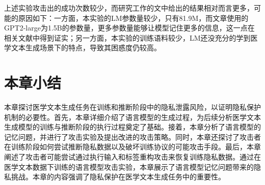 上述实验攻击出的成功次数较少，而研究工作\cite{Extrac_Train_Data_From_LM}的文中给出的结果相对而言更多，可能的原因如下：一方面，本实验的LM参数量较少，只有81.9M，而文章\cite{Extrac_Train_Data_From_LM}使用的GPT2-large为1.5B的参数量，更多参数量能够让模型记住更多的信息，这一点在相关文献中得到证实\cite{makingPTLM_few_shot, EmergentLLM, systematicLLM, GPT2, GPT3, BERT}；另一方面，本实验的训练语料较少，LM还没充分的学到医学文本生成场景下的特点，导致其困惑度仍较高。

\section{本章小结}


本章探讨医学文本生成任务在训练和推断阶段中的隐私泄露风险，以证明隐私保护机制的必要性。首先，本章详细介绍了语言模型的生成过程，为后续分析医学文本生成模型的训练与推断阶段的执行过程奠定了基础。接着，本章分析了语言模型的记忆问题，并进行了攻击实验及提出改进的攻击策略。同时，本章还探讨了攻击者在训练阶段如何尝试推断隐私数据以及破坏训练协议的可能攻击手段。最后，本章阐述了攻击者可能尝试通过执行输入和标签重构攻击来恢复训练隐私数据。通过在医学文本数据下训练的语言模型攻击实验，本章展示了语言模型记忆问题带来的隐私挑战。本章的内容强调了隐私保护在医学文本生成任务中的重要性。